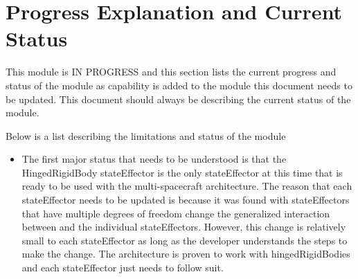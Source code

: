 
\section{Progress Explanation and Current Status}

This module is IN PROGRESS and this section lists the current progress and status of the module as capability is added to the module this document needs to be updated. This document should always be describing the current status of the module.

Below is a list describing the limitations and status of the module

\begin{itemize}
	\item The first major status that needs to be understood is that the HingedRigidBody stateEffector is the only stateEffector at this time that is ready to be used with the multi-spacecraft architecture. The reason that each stateEffector needs to be updated is because it was found with stateEffectors that have multiple degrees of freedom change the generalized interaction between  and the individual stateEffectors. However, this change is relatively small to each stateEffector as long as the developer understands the steps to make the change. The architecture is proven to work with hingedRigidBodies and each stateEffector just needs to follow suit.


\end{itemize}

